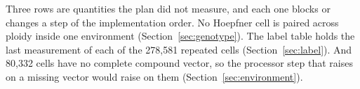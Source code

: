 Three rows are quantities the plan did not measure, and each one blocks or changes a step
of the implementation order. No Hoepfner cell is paired across ploidy inside one
environment (Section~\ref{sec:genotype}). The label table holds the last measurement of
each of the 278{,}581 repeated cells (Section~\ref{sec:label}). And 80{,}332 cells have no
complete compound vector, so the processor step that raises on a missing vector would
raise on them (Section~\ref{sec:environment}).
